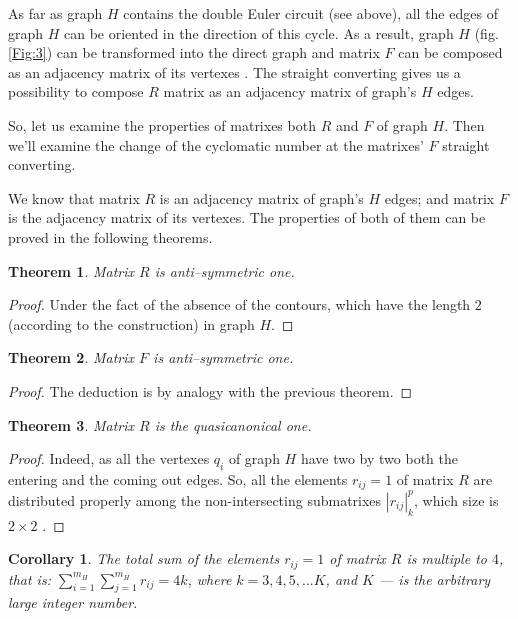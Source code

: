 \documentclass{amsart}
\newtheorem{theorem}{Theorem}
\theoremstyle{plain}
\newtheorem{corollary}{Corollary}
\numberwithin{equation}{section}
\begin{document}
As far as graph $H$ contains the double Euler circuit (see above), all the edges of graph $H$ can be oriented in the direction of this cycle. As a result, graph $H$ (fig. \ref{Fig:3}) can be transformed into the direct graph and matrix $F$ can be composed as an adjacency matrix of its vertexes \cite {Malinin}. The straight converting gives us a possibility to compose $R$ matrix as an adjacency matrix of graph's $H$ edges.

So, let us examine the properties of matrixes both $R$ and $F$ of graph $H$.
Then we'll examine the change of the cyclomatic number at the matrixes' $F$ straight converting.

We know that matrix $R$ is an adjacency matrix of graph's $H$ edges; and matrix $F$ is the adjacency matrix of its vertexes. The properties of both of them can be proved in the following theorems.

\begin{theorem}
Matrix $R$ is anti--symmetric one.
\end {theorem}

\begin {proof}
Under the fact of the absence of the contours, which have the length $2$ (according to the construction) in graph $H$.
\end {proof}

\begin {theorem}
Matrix $F$ is anti--symmetric one.
\end {theorem}

\begin {proof}
The deduction is by analogy with the previous theorem.
\end {proof}

\begin {theorem}
Matrix $R$ is the quasicanonical one.
\end {theorem}

\begin {proof}
Indeed, as all the vertexes $q_i$ of graph $H$ have two by two both the entering and the coming out edges. So, all the elements $r_{ij}=1$ of matrix $R$ are distributed properly among the non-intersecting submatrixes $|r_{ij} |_k^p$, which size is $2\times 2$ \cite {Malinin}.
\end {proof}

\begin {corollary}
The total sum of the elements $r_{ij}=1$ of matrix $R$ is multiple to $4$, that is: $\sum_{i=1}^{m_H}\sum_{j=1}^{m_H}r_{ij}=4k$, where $k=3,4,5,...K$, and $K$ --- is the arbitrary large integer number.
\end {corollary}
\end{document}
